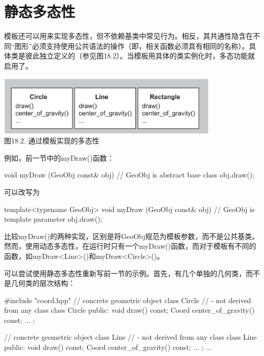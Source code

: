 \section{静态多态性}

模板还可以用来实现多态性，但不依赖基类中常见行为。相反，其共通性隐含在不同“图形”必须支持使用公共语法的操作（即，相关函数必须具有相同的名称）。具体类是彼此独立定义的（参见图18.2）。当模板用具体的类实例化时，多态功能就启用了。

\begin{center}
\includegraphics[width=0.8\textwidth]{part3/ch18/images/2.png} \\
图18.2. 通过模板实现的多态性
\end{center}

例如，前一节中的myDraw()函数：

\begin{cpp}
void myDraw (GeoObj const& obj) { // GeoObj is abstract base class
	obj.draw();
}
\end{cpp}

可以改写为

\begin{cpp}
template<typename GeoObj>
void myDraw (GeoObj const& obj) { // GeoObj is template parameter
	obj.draw();
}
\end{cpp}

比较myDraw()的两种实现，区别是将GeoObj规范为模板参数，而不是公共基类。然而，使用动态多态性，在运行时只有一个myDraw()函数，而对于模板有不同的函数，如myDraw<Line>()和myDraw<Circle>()。

可以尝试使用静态多态性重新写前一节的示例。首先，有几个单独的几何类，而不是几何类的层次结构：

\begin{cpp}
#include "coord.hpp"
// concrete geometric object class Circle
// - not derived from any class
class Circle {
	public:
	void draw() const;
	Coord center_of_gravity() const;
	...
};

// concrete geometric object class Line
// - not derived from any class
class Line {
	public:
	void draw() const;
	Coord center_of_gravity() const;
	...
};
...
\end{cpp}

